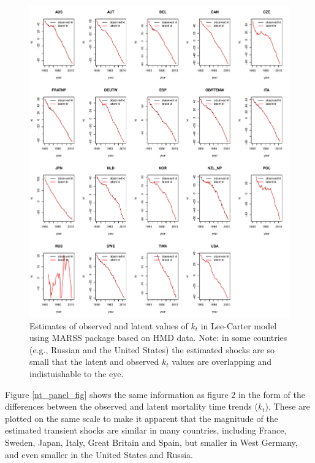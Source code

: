 \documentclass[12pt]{article}
\begin{document}
\begin{figure}
  \includegraphics[width=1.05\textwidth]{../code/kt_panel_plot.pdf}
  \caption{Estimates of observed and latent values of $k_t$ in
    Lee-Carter model using MARSS package based on HMD data. Note: in
    some countries (e.g., Russian and the United States) the estimated
    shocks are so small that the latent and observed $k_t$ values are
    overlapping and indistuishable to the eye. }
    \label{kt_panel_fig}
\end{figure}


Figure \ref{nt_panel_fig} shows the same information as figure 2 in the form of the
differences between the observed and latent mortality time trends
($k_t$). These are plotted on the same scale to make it apparent that
the magnitude of the estimated transient shocks are similar in many
countries, including France, Sweden, Japan, Italy, Great Britain and
Spain, but smaller in West Germany, and even smaller in the United
States and Russia.
\end{document}
